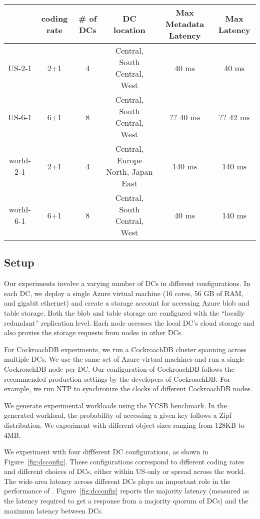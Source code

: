 \begin{figure*}
\begin{tabular}{c|c|c|c|c|c}
& coding rate & \# of DCs & DC location & Max Metadata Latency & Max Latency\\
\hline
US-2-1 & 2+1 & 4 & Central, South Central, West & 40 ms& 40 ms\\
US-6-1 & 6+1 & 8 & Central, South Central, West&?? 40 ms&?? 42 ms\\ 
world-2-1 & 2+1 & 4 & Central, Europe North, Japan East & 140 ms & 140 ms\\
world-6-1 & 6+1 & 8 & Central, South Central, West & 40 ms & 140 ms\\
\end{tabular}
\caption{The DC configurations and inter-DC latencies in various experiments~\label{fig:dcconfig}} 
\end{figure*}

\subsection{Setup}
Our experiments involve a varying number of DCs in different configurations. In
each DC, we deploy a single Azure virtual machine (16 cores, 56 GB of RAM, and
gigabit ethernet) and create a storage account for accessing Azure blob and
table storage. Both the blob and table storage are configured with the
``locally redundant'' replication level.  Each \name node accesses the local
DC's cloud storage and also proxies the storage requests from \name nodes in
other DCs.  

For CockroachDB experiments, we run a CockroachDB cluster spanning across
multiple DCs.  We use the same set of Azure virtual machines and run a single
CockroachDB node per DC. Our configuration of CockroachDB follows the
recommended production settings by the developers of CockroachDB. For example,
we run NTP to synchronize the clocks of different CockroachDB nodes. 

We generate experimental workloads using the YCSB benchmark. In the generated
workload, the probability of accessing a given key follows a Zipf distribution.
We experiment with different object sizes ranging from 128KB to 4MB. 

We experiment with four diffferent DC configurations, as shown in
Figure~\ref{fig:dcconfig}.  These configurations correspond to different coding
rates and different choices of DCs, either within US-only or spread across the
world. The wide-area latency across different DCs plays an important role in 
the performance of \name.  Figure~\ref{fig:dcconfig} reports the majority
latency (measured as the latency required to get a response from a majority
quorum of DCs) and the maximum latency between DCs.


